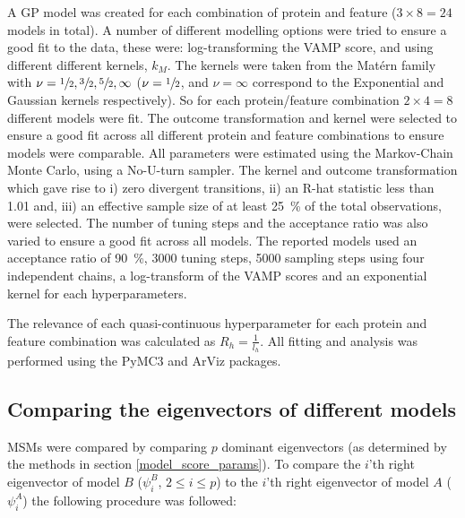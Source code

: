 \documentclass[journal=jacsat,manuscript=article]{achemso}
\begin{document}
 A GP model was created for each combination of protein and feature ($3\times 8=24$ models in total). A number of different modelling options were tried to ensure a good fit to the data, these were: log-transforming the VAMP score, and using different different kernels, $k_{M}$. The kernels were taken from the Mat\'ern family with $\nu=\sfrac{1}{2}, \sfrac{3}{2}, \sfrac{5}{2}, \infty$ ($\nu=\sfrac{1}{2}$, and $\nu=\infty$ correspond to the Exponential and Gaussian kernels respectively). So for each protein/feature combination $2\times 4 =8$ different models were fit. The outcome transformation and kernel were selected to ensure a good fit across all different protein and feature combinations to ensure models were comparable.  All parameters were estimated using the Markov-Chain Monte Carlo, using a No-U-turn sampler. The kernel and outcome transformation which gave rise to i) zero divergent transitions, ii) an R-hat statistic less than 1.01 and,  iii) an effective sample size of at least \SI{25}{\percent} of the total observations,  were selected.  The number of tuning steps and the acceptance ratio was also varied to ensure a good fit across all models. The reported models used an acceptance ratio of \SI{90}{\percent}, \num{3000} tuning steps, \num{5000} sampling steps using four independent chains, a log-transform of the VAMP scores and an exponential kernel for each hyperparameters.  
 
 The relevance of each quasi-continuous hyperparameter for each protein and feature combination was calculated as $R_{h} = \frac{1}{l_{h}}$.  
 All fitting and analysis was performed using the PyMC3 and ArViz packages. 
 
 \subsection{Comparing the eigenvectors of different models}
 
MSMs were compared by comparing $p$ dominant eigenvectors (as determined by the methods in section \ref{model_score_params}). To compare the $i$'th right eigenvector of model $B$ ($\psi^{B}_{i}$, $2 \le i \le p$) to the $i$'th right eigenvector of model $A$ ($\psi^{A}_{i}$) the following procedure was followed: 
\end{document}
